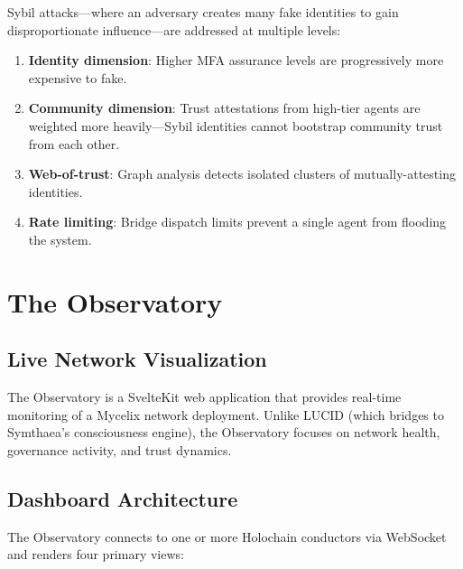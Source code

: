 \documentclass[12pt]{book}
\begin{document}
Sybil attacks---where an adversary creates many fake identities to gain
disproportionate influence---are addressed at multiple levels:

\begin{enumerate}
  \item \textbf{Identity dimension}: Higher MFA assurance levels are
    progressively more expensive to fake.
  \item \textbf{Community dimension}: Trust attestations from high-tier agents
    are weighted more heavily---Sybil identities cannot bootstrap community
    trust from each other.
  \item \textbf{Web-of-trust}: Graph analysis detects isolated clusters of
    mutually-attesting identities.
  \item \textbf{Rate limiting}: Bridge dispatch limits prevent a single agent
    from flooding the system.
\end{enumerate}


\chapter{The Observatory}
\label{ch:observatory}

\section{Live Network Visualization}

The Observatory is a SvelteKit web application that provides real-time
monitoring of a Mycelix network deployment. Unlike LUCID (which bridges
to Symthaea's consciousness engine), the Observatory focuses on network
health, governance activity, and trust dynamics.

\section{Dashboard Architecture}

The Observatory connects to one or more Holochain conductors via WebSocket
and renders four primary views:
\end{document}
